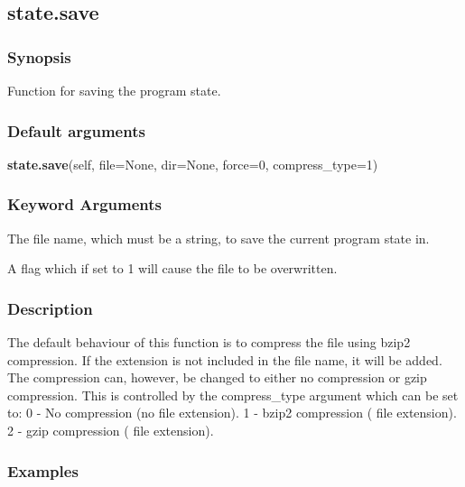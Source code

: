 





\newpage

\subsection{state.save}


\subsubsection{Synopsis}

Function for saving the program state.

\subsubsection{Default arguments}

\textsf{\textbf{state.save}(self, file=None, dir=None, force=0, compress\_type=1)}


\subsubsection{Keyword Arguments}

  The file name, which must be a string, to save the current program state in.

  A flag which if set to 1 will cause the file to be overwritten.

\subsubsection{Description}

The default behaviour of this function is to compress the file using bzip2 compression.  If
the extension 
 is not included in the file name, it will be added.  The compression
can, however, be changed to either no compression or gzip compression.  This is controlled
by the compress\_type argument which can be set to:
    0 - No compression (no file extension).
    1 - bzip2 compression (
 file extension).
    2 - gzip compression (
 file extension).


\subsubsection{Examples}

